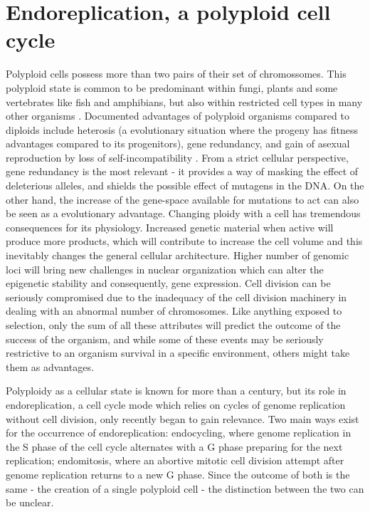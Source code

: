 \documentclass[11pt,twoside,a4paper]{report}
\begin{document}
	\section{Endoreplication, a polyploid cell cycle}
		Polyploid cells possess more than two pairs of their set of chromossomes. This polyploid state is common to be predominant within fungi, plants and some vertebrates like fish and amphibians, but also within restricted cell types in many other organisms \cite{Fox2013}.
		Documented advantages of polyploid organisms compared to diploids include heterosis (a evolutionary situation where the progeny has fitness advantages compared to its progenitors), gene redundancy, and gain of asexual reproduction by loss of self-incompatibility \cite{Comai2005}. From a strict cellular perspective, gene redundancy is the most relevant - it provides a way of masking the effect of deleterious alleles, and shields the possible effect of mutagens in the DNA. On the other hand, the increase of the gene-space available for mutations to act can also be seen as a evolutionary advantage.
		Changing ploidy with a cell has tremendous consequences for its physiology. Increased genetic material when active will produce more products, which will contribute to increase the cell volume and this inevitably changes the general cellular architecture. Higher number of genomic loci will bring new challenges in nuclear organization which can alter the epigenetic stability and consequently, gene expression. Cell division can be seriously compromised due to the inadequacy of the cell division machinery in dealing with an abnormal number of chromosomes. Like anything exposed to selection, only the sum of all these attributes will predict the outcome of the success of the organism, and while some of these events may be seriously restrictive to an organism survival in a specific environment, others might take them as advantages.
		
		Polyploidy as a cellular state is known for more than a century, but its role in endoreplication, a cell cycle mode which relies on cycles of genome replication without cell division, only recently began to gain relevance. Two main ways exist for the occurrence of endoreplication: endocycling, where genome replication in the S phase of the cell cycle alternates with a G phase preparing for the next replication; endomitosis, where an abortive mitotic cell division attempt after genome replication returns to a new G phase. Since the outcome of both is the same - the creation of a single polyploid cell - the distinction between the two can be unclear.
		
\end{document}
